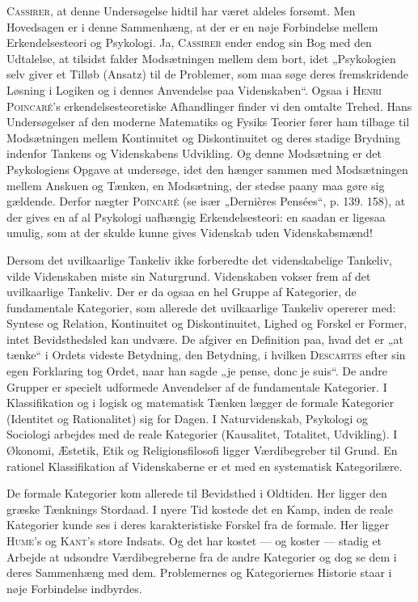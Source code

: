 \documentclass[12pt]{article}
\begin{document}
\textsc{Cassirer}, at denne Undersøgelse hidtil har været aldeles forsømt. Men
Hovedsagen er i denne Sammenhæng, at der er en nøje Forbindelse mellem
Erkendelsesteori og Psykologi. Ja, \textsc{Cassirer} ender endog sin Bog med den
Udtalelse, at tilsidst falder Modsætningen mellem dem bort, idet „Psykologien
selv giver et Tilløb (Ansatz) til de Problemer, som maa søge deres
fremskridende Løsning i Logiken og i dennes Anvendelse paa Videnskaben“. Ogsaa
i \textsc{Henri Poincaré}'s erkendelsesteoretiske Afhandlinger finder vi den
omtalte Trehed. Hans Undersøgelser af den moderne Matematiks og Fysiks Teorier
fører ham tilbage til Modsætningen mellem Kontinuitet og Diskontinuitet og deres
stadige Brydning indenfor Tankens og Videnskabens Udvikling. Og denne Modsætning
er det Psykologiens Opgave at undersøge, idet den hænger sammen med Modsætningen
mellem Anskuen og Tænken, en Modsætning, der stedse paany maa gøre sig
gældende. Derfor nægter \textsc{Poincaré} (se især „Dernières Pensées“, p. 139.
158), at der gives en af al Psykologi uafhængig Erkendelsesteori: en saadan er
ligesaa umulig, som at der skulde kunne gives Videnskab uden Videnskabsmænd!

Dersom det uvilkaarlige Tankeliv ikke forberedte det videnskabelige Tankeliv,
vilde Videnskaben miste sin Naturgrund. Videnskaben vokser frem af det
uvilkaarlige Tankeliv. Der er da ogsaa en hel Gruppe af Kategorier, de
fundamentale Kategorier, som allerede det uvilkaarlige Tankeliv opererer med:
Syntese og Relation, Kontinuitet og Diskontinuitet, Lighed og Forskel er Former,
intet Bevidsthedsled kan undvære. De afgiver en Definition paa, hvad det er „at
tænke“ i Ordets videste Betydning, den Betydning, i hvilken \textsc{Descartes}
efter sin egen Forklaring tog Ordet, naar han sagde „je pense, donc je suis“. De
andre Grupper er specielt udformede Anvendelser af de fundamentale Kategorier. I
Klassifikation og i logisk og matematisk Tænken lægger de formale Kategorier
(Identitet og Rationalitet) sig for Dagen. I Naturvidenskab, Psykologi og
Sociologi arbejdes med de reale Kategorier (Kausalitet, Totalitet, Udvikling). I
Økonomi, Æstetik, Etik og Religionsfilosofi ligger Værdibegreber til Grund. En
rationel Klassifikation af Videnskaberne er et med en systematisk Kategorilære.

De formale Kategorier kom allerede til Bevidsthed i Oldtiden. Her ligger den
græske Tænknings Stordaad. I nyere Tid kostede det en Kamp, inden de reale
Kategorier kunde ses i deres karakteristiske Forskel fra de formale. Her ligger
\textsc{Hume}'s og \textsc{Kant}'s store Indsats. Og det har kostet --- og
koster --- stadig et Arbejde at udsondre Værdibegreberne fra de andre Kategorier
og dog se dem i deres Sammenhæng med dem. Problemernes og Kategoriernes Historie
staar i nøje Forbindelse indbyrdes.
\end{document}
